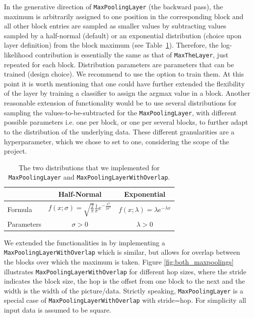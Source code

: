 In the generative direction of \texttt{MaxPoolingLayer} (the backward pass), the maximum is arbitrarily assigned to one position in the corresponding block and all other block entries are sampled as smaller values by subtracting values sampled by a half-normal (default) or an exponential distribution (choice upon layer definition) from the block maximum (see Table~\ref{table:maxpool_distributions}). Therefore, the log-likelihood contribution is essentially the same as that of \texttt{MaxTheLayer}, just repeated for each block. Distribution parameters are parameters that can be trained (design choice). We recommend to use the option to train them. At this point it is worth mentioning that one could have further extended the flexibility of the layer by training a classifier to assign the argmax value in a block. Another reasonable extension of functionality would be to use several distributions for sampling the values-to-be-subtracted for the \texttt{MaxPoolingLayer}, with different possible parameters i.e. one per block, or one per several blocks, to further adapt to the distribution of the underlying data. These different granularities are a hyperparameter, which we chose to set to one, considering the scope of the project.
\begin{table}[H]
    \centering
    \begin{tabular}{lcc}
    \toprule
    & Half-Normal & Exponential \\
    \midrule
    Formula & $f(x; \sigma) = \sqrt{\frac{2}{\pi}} \frac{1}{\sigma} e^{-\frac{x^2}{2\sigma^2}}$ & $f(x; \lambda) = \lambda e^{-\lambda x}$ \\
    Parameters & $\sigma > 0$ & $\lambda > 0$ \\
    \bottomrule
    \end{tabular}
    \caption{The two distributions that we implemented for \texttt{MaxPoolingLayer} and \texttt{MaxPoolingLayerWithOverlap}.}
    \label{table:maxpool_distributions}
\end{table}
We extended the functionalities in \cite{nielsen2020survae} by implementing a \texttt{MaxPoolingLayerWithOverlap} which is similar, but allows for overlap between the blocks over which the maximum is taken. Figure \ref{fig:both_maxpoolings} illustrates \texttt{MaxPoolingLayerWithOverlap} for different hop sizes, where the stride indicates the block size, the hop is the offset from one block to the next and the width is the width of the picture/data. Strictly speaking, \texttt{MaxPoolingLayer} is a special case of \texttt{MaxPoolingLayerWithOverlap} with stride=hop. For simplicity all input data is assumed to be square.
